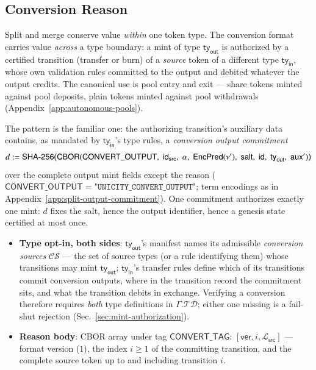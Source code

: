 \subsection{Conversion Reason}\label{app:reason-convert}

Split and merge conserve value \emph{within} one token type. The conversion format carries value \emph{across} a type boundary: a mint of type $\mathsf{ty}_\mathsf{out}$ is authorized by a certified transition (transfer or burn) of a \emph{source} token of a different type $\mathsf{ty}_\mathsf{in}$, whose own validation rules committed to the output and debited whatever the output credits. The canonical use is pool entry and exit --- share tokens minted against pool deposits, plain tokens minted against pool withdrawals (Appendix~\ref{app:autonomous-pools}).

The pattern is the familiar one: the authorizing transition's auxiliary data contains, as mandated by $\mathsf{ty}_\mathsf{in}$'s type rules, a \emph{conversion output commitment}
\[
d := \mathsf{SHA\text{-}256}\bigl(\mathsf{CBOR}(
	\mathsf{CONVERT\_OUTPUT},\;
	\mathsf{id}_\mathsf{src},\;
	\alpha,\;
	\mathsf{EncPred}(\nu'),\;
	\mathsf{salt},\;
	\mathsf{id},\;
	\mathsf{ty}_\mathsf{out},\;
	\mathsf{aux}'
)\bigr)
\]
over the complete output mint fields except the reason ($\mathsf{CONVERT\_OUTPUT} = \texttt{"UNICITY\_CONVERT\_OUTPUT"}$; term encodings as in Appendix~\ref{app:split-output-commitment}). One commitment authorizes exactly one mint: $d$ fixes the salt, hence the output identifier, hence a genesis state certified at most once.

\begin{itemize}
	\item \textbf{Type opt-in, both sides}: $\mathsf{ty}_\mathsf{out}$'s manifest names its admissible \emph{conversion sources} $\mathcal{CS}$ --- the set of source types (or a rule identifying them) whose transitions may mint $\mathsf{ty}_\mathsf{out}$; $\mathsf{ty}_\mathsf{in}$'s transfer rules define which of its transitions commit conversion outputs, where in the transition record the commitment sits, and what the transition debits in exchange. Verifying a conversion therefore requires \emph{both} type definitions in $\Gamma.\mathcal{TD}$; either one missing is a fail-shut rejection (Sec.~\ref{sec:mint-authorization}).
	\item \textbf{Reason body}: CBOR array under tag $\mathsf{CONVERT\_TAG}$: $[\mathsf{ver}, i, \mathcal{L}_\mathsf{src}]$ --- format version ($1$), the index $i \ge 1$ of the committing transition, and the complete source token up to and including transition $i$.
\end{itemize}

